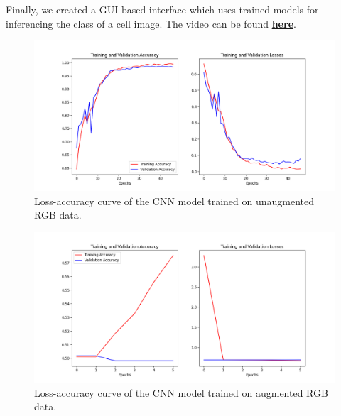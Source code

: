 \documentclass[10pt,twocolumn,letterpaper]{article}
\begin{document}
Finally, we created a GUI-based interface which uses trained models for inferencing the class of a cell image. The video can be found \href{https://drive.google.com/file/d/1PuiOddcjlm_IbtReFyz8v2K37MM5XqCo/view?usp=share_link}{\textbf{here}}.

\begin{figure}[t]
   \begin{center}
      \includegraphics[width=1\linewidth]{../Plots/loss-curves/CNN_unaug_losscurve.png}
   \end{center}
      \caption{Loss-accuracy curve of the CNN model trained on unaugmented RGB data.}
   \label{fig:cnn_rgb_losscurve}
\end{figure}

\begin{figure}[t]
   \begin{center}
      \includegraphics[width=1\linewidth]{../Plots/loss-curves/CNN_aug_losscurve.png}
   \end{center}
      \caption{Loss-accuracy curve of the CNN model trained on augmented RGB data.}
   \label{fig:cnn_rgb_aug_losscurve}
\end{figure}
\end{document}
